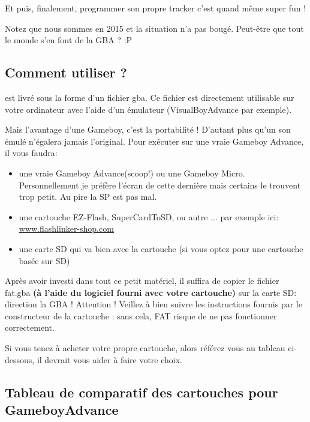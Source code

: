 \documentclass[12pt,a4paper]{article}
\begin{document}
    Et puis, finalement, programmer son propre tracker c'est quand même super fun ! \medskip

    Notez que nous sommes en 2015 et la situation n'a pas bougé. Peut-être que tout le monde s'en fout de la GBA ? :P \medskip
    
    
    \subsection{Comment utiliser \FAT ?}

    \FAT est livré sous la forme d'un fichier gba. Ce fichier est directement utilisable sur votre ordinateur avec l'aide d'un émulateur (VisualBoyAdvance par exemple).\medskip
    
    Mais l'avantage d'une Gameboy, c'est la portabilité ! D'autant plus qu'un son émulé n'égalera jamais l'original. Pour exécuter \FAT sur une vraie Gameboy Advance, il vous faudra:
    \begin{itemize}
        \item{une vraie Gameboy Advance(scoop!) ou une Gameboy Micro. Personnellement je préfère l'écran de cette dernière mais certains le trouvent trop petit. Au pire la SP est pas mal.}
        \item{une cartouche EZ-Flash, SuperCardToSD, ou autre ... par exemple ici: \href{http://www.flashlinker-shop.com/ez-flash-iv-minisd-slot-2-p-443.html}{www.flashlinker-shop.com}}
        \item{une carte SD qui va bien avec la cartouche (si vous optez pour une cartouche basée sur SD)} 
    \end{itemize}\medskip
    
    Après avoir investi dans tout ce petit matériel, il suffira de copier le fichier fat.gba {\bf (à l'aide du logiciel fourni avec votre cartouche)} sur la carte SD: direction la GBA ! Attention ! Veillez à bien suivre les instructions fournis par le constructeur de la cartouche : sans cela, FAT risque de ne pas fonctionner correctement.
    
    
    Si vous tenez à acheter votre propre cartouche, alors référez vous au tableau ci-dessous, il devrait vous aider à faire votre choix.
    
    \subsection{Tableau de comparatif des cartouches pour GameboyAdvance}
    
\end{document}
